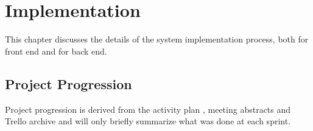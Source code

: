 
\chapter{Implementation}

This chapter discusses the details of the system implementation process, both for front end and for back end.


\section{Project Progression}
Project progression is derived from the activity plan , meeting abstracts  and Trello archive   and will only briefly summarize what was done at each sprint.

